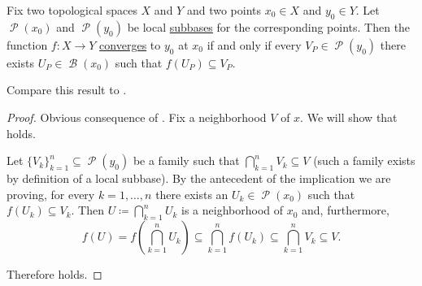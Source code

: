 \begin{proposition}\label{thm:cauchy_function_convergence_via_subbases}
  Fix two topological spaces \( X \) and \( Y \) and two points \( x_0 \in X \) and \( y_0 \in Y \). Let \( \mscrP(x_0) \) and \( \mscrP(y_0) \) be local \hyperref[def:topological_local_subbase]{subbases} for the corresponding points. Then the function \( f: X \to Y \) \hyperref[def:local_convergence]{converges} to \( y_0 \) at \( x_0 \) if and only if every \( V_P \in \mscrP(y_0) \) there exists \( U_P \in \mscrB(x_0) \) such that \( f(U_P) \subseteq V_P \).

  Compare this result to .
\end{proposition}
\begin{proof}
  \SufficiencySubProof Obvious consequence of .
  \NecessitySubProof Fix a neighborhood \( V \) of \( x \). We will show that  holds.

  Let \( \{ V_k \}_{k=1}^n \subseteq \mscrP(y_0) \) be a family such that \( \bigcap_{k=1}^n V_k \subseteq V \) (such a family exists by definition of a local subbase). By the antecedent of the implication we are proving, for every \( k = 1, \ldots, n \) there exists an \( U_k \in \mscrP(x_0) \) such that \( f(U_k) \subseteq V_k \). Then \( U \coloneqq \bigcap_{k=1}^n U_k \) is a neighborhood of \( x_0 \) and, furthermore,
  \begin{equation*}
    f(U)
    =
    f\left(\bigcap_{k=1}^n U_k \right)
    \subseteq
    \bigcap_{k=1}^n f(U_k)
    \subseteq
    \bigcap_{k=1}^n V_k
    \subseteq
    V.
  \end{equation*}

  Therefore  holds.
\end{proof}
